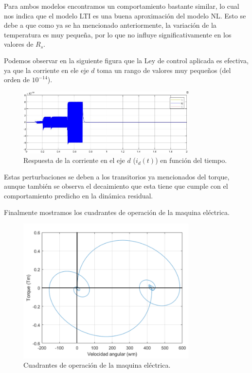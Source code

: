 \documentclass{article}
\begin{document}
Para ambos modelos encontramos un comportamiento bastante similar, lo cual nos indica que el modelo LTI
es una buena aproximación del modelo NL. Esto se debe a que como ya se ha mencionado anteriormente, la 
variación de la temperatura es muy pequeña, por lo que no influye significativamente en los valores de $R_s$.

Podemos observar en la siguiente figura que la Ley de control aplicada es efectiva, ya que la corriente
en ele eje $d$ toma un rango de valores muy pequeños (del orden de $10^{-14}$).

\begin{figure}[H]
    \centering
    \includegraphics[width=0.8\textwidth]{5.1.6_id.jpg}
    \caption{Respuesta de la corriente en el eje $d$ ($i_d(t)$) en función del tiempo.}
\end{figure}

Estas perturbaciones se deben a los transitorios ya mencionados del torque, aunque también se observa 
el decaimiento que esta tiene que cumple con el comportamiento predicho en la dinámica residual. 

Finalmente mostramos los cuadrantes de operación de la maquina eléctrica.

\begin{figure}[H]
    \centering
    \includegraphics[width=0.8\textwidth]{5.1.6_torque_velocidad.png}
    \caption{Cuadrantes de operación de la maquina eléctrica.}
\end{figure}
\end{document}

